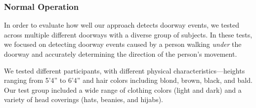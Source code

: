 



\subsubsection{Normal Operation}
\label{sec:normal_operation}

In order to evaluate how well our approach detects doorway events, we tested \sysname across multiple different doorways with a diverse group of subjects.
In these tests, we focused on detecting doorway events caused by a person walking \textit{under} the doorway and accurately determining the direction of the person's movement.

We tested \numPeople different participants, with different physical characteristics---heights ranging from 5'4'' to 6'4'' and hair colors including blond, brown, black, and bald.  Our test group included a wide range of clothing colors (light and dark) and a variety of head coverings (hats, beanies, and hijabs).


